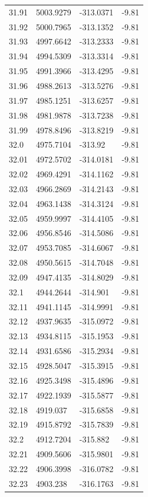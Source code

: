 \begin{table}[H]
\begin{tabular}{llll}
31.91 & 5003.9279 & -313.0371 & -9.81 \\
31.92 & 5000.7965 & -313.1352 & -9.81 \\
31.93 & 4997.6642 & -313.2333 & -9.81 \\
31.94 & 4994.5309 & -313.3314 & -9.81 \\
31.95 & 4991.3966 & -313.4295 & -9.81 \\
31.96 & 4988.2613 & -313.5276 & -9.81 \\
31.97 & 4985.1251 & -313.6257 & -9.81 \\
31.98 & 4981.9878 & -313.7238 & -9.81 \\
31.99 & 4978.8496 & -313.8219 & -9.81 \\
32.0 & 4975.7104 & -313.92 & -9.81 \\
32.01 & 4972.5702 & -314.0181 & -9.81 \\
32.02 & 4969.4291 & -314.1162 & -9.81 \\
32.03 & 4966.2869 & -314.2143 & -9.81 \\
32.04 & 4963.1438 & -314.3124 & -9.81 \\
32.05 & 4959.9997 & -314.4105 & -9.81 \\
32.06 & 4956.8546 & -314.5086 & -9.81 \\
32.07 & 4953.7085 & -314.6067 & -9.81 \\
32.08 & 4950.5615 & -314.7048 & -9.81 \\
32.09 & 4947.4135 & -314.8029 & -9.81 \\
32.1 & 4944.2644 & -314.901 & -9.81 \\
32.11 & 4941.1145 & -314.9991 & -9.81 \\
32.12 & 4937.9635 & -315.0972 & -9.81 \\
32.13 & 4934.8115 & -315.1953 & -9.81 \\
32.14 & 4931.6586 & -315.2934 & -9.81 \\
32.15 & 4928.5047 & -315.3915 & -9.81 \\
32.16 & 4925.3498 & -315.4896 & -9.81 \\
32.17 & 4922.1939 & -315.5877 & -9.81 \\
32.18 & 4919.037 & -315.6858 & -9.81 \\
32.19 & 4915.8792 & -315.7839 & -9.81 \\
32.2 & 4912.7204 & -315.882 & -9.81 \\
32.21 & 4909.5606 & -315.9801 & -9.81 \\
32.22 & 4906.3998 & -316.0782 & -9.81 \\
32.23 & 4903.238 & -316.1763 & -9.81 \\

\end{tabular}
\end{table}
